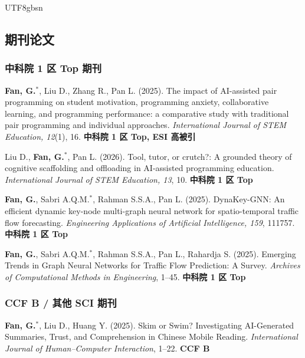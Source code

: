 \documentclass[a4paper,10pt]{article}
\newcommand{\pubitem}[1]{\item #1}
\begin{document}
\begin{CJK*}{UTF8}{gbsn}
\begin{enumerate}[label={[C\arabic*]}, resume]
\end{enumerate}


\subsection*{期刊论文}

\subsubsection*{中科院 1 区 Top 期刊}

\begin{enumerate}[label={[J\arabic*]}]
    \pubitem{\textbf{Fan, G.}$^*$, Liu D., Zhang R., Pan L. (2025). The impact of AI-assisted pair programming on student motivation, programming anxiety, collaborative learning, and programming performance: a comparative study with traditional pair programming and individual approaches. \textit{International Journal of STEM Education, 12}(1), 16. \textbf{中科院 1 区 Top, ESI 高被引}}
    
    \pubitem{Liu D., \textbf{Fan, G.}$^*$, Pan L. (2026). Tool, tutor, or crutch?: A grounded theory of cognitive scaffolding and offloading in AI-assisted programming education. \textit{International Journal of STEM Education, 13}, 10. \textbf{中科院 1 区 Top}}
    
    \pubitem{\textbf{Fan, G.}, Sabri A.Q.M.$^*$, Rahman S.S.A., Pan L. (2025). DynaKey-GNN: An efficient dynamic key-node multi-graph neural network for spatio-temporal traffic flow forecasting. \textit{Engineering Applications of Artificial Intelligence, 159}, 111757. \textbf{中科院 1 区 Top}}
    
    \pubitem{\textbf{Fan, G.}, Sabri A.Q.M.$^*$, Rahman S.S.A., Pan L., Rahardja S. (2025). Emerging Trends in Graph Neural Networks for Traffic Flow Prediction: A Survey. \textit{Archives of Computational Methods in Engineering}, 1--45. \textbf{中科院 1 区 Top}}

\end{enumerate}

\subsubsection*{CCF B / 其他 SCI 期刊}

\begin{enumerate}[label={[J\arabic*]}, resume]
    \pubitem{\textbf{Fan, G.}$^*$, Liu D., Huang Y. (2025). Skim or Swim? Investigating AI-Generated Summaries, Trust, and Comprehension in Chinese Mobile Reading. \textit{International Journal of Human--Computer Interaction}, 1--22. \textbf{CCF B}}
\end{enumerate}


\end{CJK*}
\end{document}
